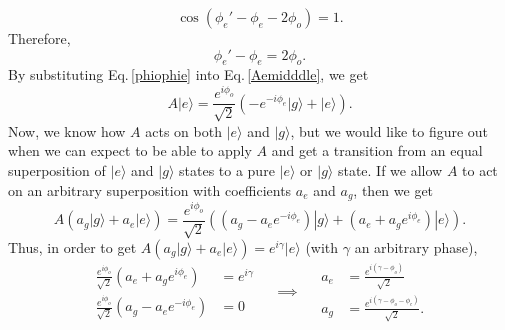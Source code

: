 \begin{equation}
\cos\left(\phi_e'-\phi_e-2\phi_o\right) = 1.
\end{equation}
Therefore, 
\begin{equation}
\phi_e'-\phi_e = 2\phi_o.\label{phiophie}
\end{equation}
By substituting Eq.\,\eqref{phiophie} into Eq.\,\eqref{Aemidddle}, we get
\begin{equation}
A|e\rangle = \frac{e^{i\phi_o}}{\sqrt{2}}\left(-e^{-i\phi_e}|g\rangle + |e\rangle \right).
\end{equation}
Now, we know how $A$ acts on both $|e\rangle$ and $|g\rangle$, but we would like to figure out when we can expect to be able to apply $A$ and get a transition from an equal superposition of $|e\rangle$ and $|g\rangle$ states to a pure $|e\rangle$ or $|g\rangle$ state. If we allow $A$ to act on an arbitrary superposition with coefficients $a_e$ and $a_g$, then we get 
\begin{equation}
A\left(a_g|g\rangle+a_e|e\rangle\right)= 
\frac{e^{i\phi_o}}{\sqrt{2}}
\left(
(a_g-a_e e^{-i\phi_e})|g\rangle +
(a_e+a_g e^{i\phi_e})|e\rangle 
\right).\label{howAActs}
\end{equation}
Thus, in order to get $A\left(a_g|g\rangle+a_e|e\rangle\right)=e^{i\gamma}|e\rangle$ (with $\gamma$ an arbitrary phase), 
\begin{equation}
\begin{aligned}
\frac{e^{i\phi_o}}{\sqrt{2}}\left(a_e+a_ge^{i\phi_e}\right) &= e^{i\gamma} \\
\frac{e^{i\phi_o}}{\sqrt{2}}\left(a_g-a_e e^{-i\phi_e}\right) &= 0 
\end{aligned}
\quad\implies\quad
\begin{aligned}
a_e&=\frac{e^{i(\gamma-\phi_o)}}{\sqrt{2}}\\
a_g&=\frac{e^{i(\gamma-\phi_o-\phi_e)}}{\sqrt{2}}.
\end{aligned}
\end{equation}
